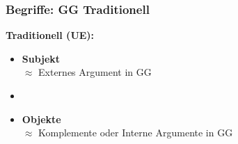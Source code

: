 \begin{frame}
\frametitle{Begriffe: GG \vs Traditionell}

	\begin{minipage}[b]{0.4\textwidth}
		\footnotesize
	\textbf{Traditionell (UE):}
		\begin{itemize}
		\item \alert{\textbf{Subjekt}}\\
		$\approx$ Externes Argument in GG
		\item[]
		\item \textbf{Objekte}\\
		$\approx$ Komplemente oder Interne Argumente in GG
		\end{itemize}	
  	\end{minipage}  
	\begin{minipage}[b]{0.55\textwidth}
		\begin{figure}
	\centering
	\end{figure}	
  	\end{minipage}

\end{frame}


